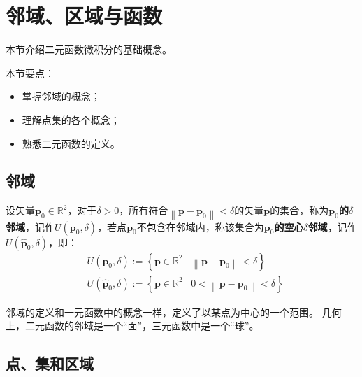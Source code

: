 \section{邻域、区域与函数}

本节介绍二元函数微积分的基础概念。

本节要点：
\begin{itemize}
    \item 掌握邻域的概念；
    \item 理解点集的各个概念；
    \item 熟悉二元函数的定义。
\end{itemize}

\subsection{邻域}

\begin{definition}[邻域]
设矢量$\boldsymbol{p}_0\in \mathbb{R} ^2$，对于$\delta >0$，所有符合$\left\| \boldsymbol{p}-\boldsymbol{p}_0 \right\| <\delta $的矢量$\boldsymbol{p}$的集合，称为{\bf $\boldsymbol{p}_0$的$\delta $邻域}，记作$U\left( \boldsymbol{p}_0,\delta \right) $，若点$\boldsymbol{p}_0$不包含在邻域内，称该集合为{\bf $\boldsymbol{p}_0$的空心$\delta $邻域}，记作$U\left( \boldsymbol{\hat{p}}_0,\delta \right) $，即：
\begin{align*}
&U\left( \boldsymbol{p}_0,\delta \right) :=\left\{ \boldsymbol{p}\in \mathbb{R} ^2 \middle| \left\| \boldsymbol{p}-\boldsymbol{p}_0 \right\| <\delta \right\} \\
&U\left( \boldsymbol{\hat{p}}_0,\delta \right) :=\left\{ \boldsymbol{p}\in \mathbb{R} ^2 \middle| 0<\left\| \boldsymbol{p}-\boldsymbol{p}_0 \right\| <\delta \right\}
\end{align*}
\end{definition}

邻域的定义和一元函数中的概念一样，定义了以某点为中心的一个范围。
几何上，二元函数的邻域是一个“面”，三元函数中是一个“球”。

\subsection{点、集和区域}

